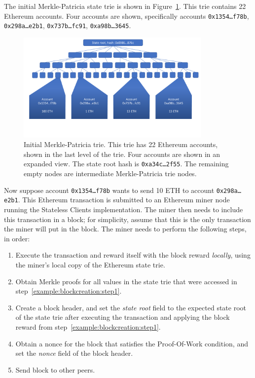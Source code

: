 \documentclass[12pt]{article}
\newcommand{\System}{Stateless Clients\xspace}
\newcommand{\figurewidth}{0.85\textwidth}
\begin{document}
The initial Merkle-Patricia state trie is shown in Figure~\ref{fig:example:initial}. This trie contains 22 Ethereum accounts. Four accounts are shown, specifically accounts \texttt{0x1354\ldots f78b}, \texttt{0x298a\ldots e2b1}, \texttt{0x737b\ldots fc91}, \texttt{0xa98b\ldots 3645}.
\begin{figure}[H]
  \centering
  \includegraphics[width=\figurewidth,page=1]{../figures/design/example.pdf}
  \caption{Initial Merkle-Patricia trie. This trie has 22 Ethereum accounts, shown in the last level of the trie. Four accounts are shown in an expanded view. The state root hash is \texttt{0xa34c\ldots 2f55}. The remaining empty nodes are intermediate Merkle-Patricia trie nodes.}
  \label{fig:example:initial}
\end{figure}

Now suppose account \texttt{0x1354\ldots f78b} wants to send 10 ETH to account \texttt{0x298a\ldots e2b1}. This Ethereum transaction is submitted to an Ethereum miner node running the \System implementation. The miner then needs to include this transaction in a block; for simplicity, assume that this is the only transaction the miner will put in the block. The miner needs to perform the following steps, in order:
\begin{enumerate}
  \item Execute the transaction and reward itself with the block reward \emph{locally}, using the miner's local copy of the Ethereum state trie. \label{example:blockcreation:step1}
  \item Obtain Merkle proofs for all values in the state trie that were accessed in step~\ref{example:blockcreation:step1}.
  \item Create a block header, and set the \emph{state root} field to the expected state root of the state trie after executing the transaction and applying the block reward from step~\ref{example:blockcreation:step1}.
  \item Obtain a nonce for the block that satisfies the Proof-Of-Work condition, and set the \emph{nonce} field of the block header.
  \item Send block to other peers.
\end{enumerate}
\end{document}
